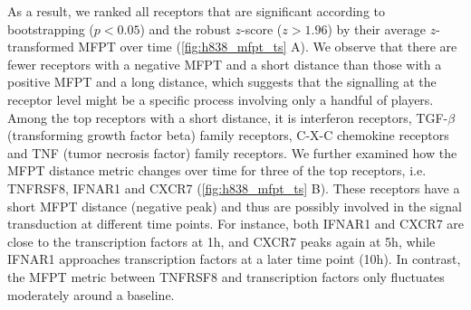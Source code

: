 As a result, we ranked all receptors that are significant
according to bootstrapping ($p<0.05$) and the robust 
$z$-score ($z>1.96$) by their average $z$-transformed MFPT
over time (\ref{fig:h838_mfpt_ts} A).
We observe that there are fewer receptors with a negative
MFPT and a short distance than those with a positive
MFPT and a long distance, which suggests that the signalling
at the receptor level might be a specific process 
involving only a handful of players.
Among the top receptors with a short distance, it is 
interferon receptors, TGF-$\beta$ (transforming growth
factor beta) family receptors, 
C-X-C chemokine receptors and TNF (tumor necrosis factor) 
family receptors.
We further examined how the MFPT distance metric changes
over time for three of the top receptors, i.e. TNFRSF8, 
IFNAR1 and CXCR7 (\ref{fig:h838_mfpt_ts} B). 
These receptors have a short MFPT distance (negative peak) 
and thus are
possibly involved in the signal transduction at different 
time points. For instance, both IFNAR1 and CXCR7 are close
to the transcription factors at 1h, and CXCR7 peaks again
at 5h, while IFNAR1 approaches transcription factors at
a later time point (10h). In contrast, the MFPT metric
between TNFRSF8 and transcription factors only fluctuates
moderately around a baseline.



